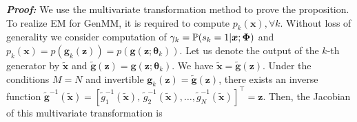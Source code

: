 \noindent \emph{\textbf{Proof:}} We use the multivariate transformation method to prove the proposition. To realize EM for GenMM, it is required to compute $p_k(\bm{x}),\forall k$. Without loss of generality we consider computation of $\gamma_k  = \mathbb{P}(s_k =1|\bm{x};\bm{\Phi})$ and $p_k(\bm{x}) =  p(\bm{g}_k(\bm{z})) =p(\bm{g}(\bm{z};\bm{\theta}_k))$. 
Let us denote the output of the $k$-th generator by $\tilde{\bm{x}}$ %
and $\tilde{\bm{g}}(\bm{z})%
= \bm{g}(\bm{z};\bm{\theta}_k)$. We have $\tilde{\bm{x}} = \tilde{\bm{g}}(\bm{z})$. Under the conditions $M=N$ and invertible $\bm{g}_k(\bm{z}) = \tilde{\bm{g}}(\bm{z})$, there exists an inverse function $\tilde{\bm{g}}^{-1}(\tilde{\bm{x}})=[\tilde{g}_1^{-1}(\tilde{\bm{x}}), \, \tilde{g}_2^{-1}(\tilde{\bm{x}}), \hdots, \tilde{g}_N^{-1}(\tilde{\bm{x}})]^{\top}=\bm{z}$. Then, the Jacobian of this multivariate transformation is

